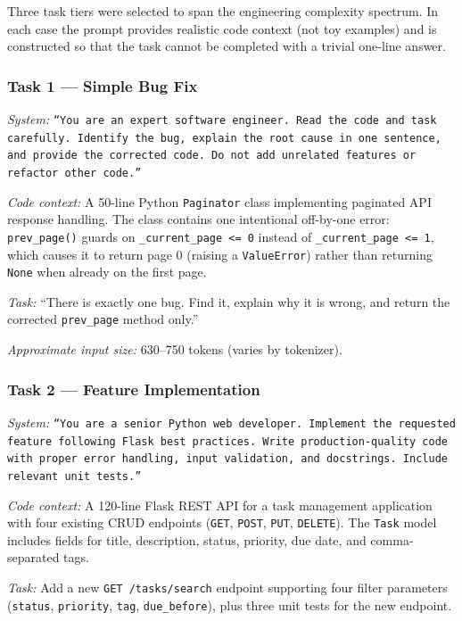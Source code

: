 \documentclass{article}
\begin{document}
Three task tiers were selected to span the engineering complexity spectrum.
In each case the prompt provides realistic code context (not toy examples) and
is constructed so that the task cannot be completed with a trivial one-line answer.

\subsubsection*{Task 1 --- Simple Bug Fix}

\textit{System:} \texttt{``You are an expert software engineer. Read the code and task
carefully. Identify the bug, explain the root cause in one sentence, and provide the
corrected code. Do not add unrelated features or refactor other code.''}

\textit{Code context:} A 50-line Python \texttt{Paginator} class implementing paginated
API response handling. The class contains one intentional off-by-one error:
\texttt{prev\_page()} guards on \texttt{\_current\_page <= 0} instead of
\texttt{\_current\_page <= 1}, which causes it to return page 0 (raising a
\texttt{ValueError}) rather than returning \texttt{None} when already on the first page.

\textit{Task:} ``There is exactly one bug. Find it, explain why it is wrong, and return
the corrected \texttt{prev\_page} method only.''

\textit{Approximate input size:} 630--750 tokens (varies by tokenizer).

\subsubsection*{Task 2 --- Feature Implementation}

\textit{System:} \texttt{``You are a senior Python web developer. Implement the requested
feature following Flask best practices. Write production-quality code with proper error
handling, input validation, and docstrings. Include relevant unit tests.''}

\textit{Code context:} A 120-line Flask REST API for a task management application with
four existing CRUD endpoints (\texttt{GET}, \texttt{POST}, \texttt{PUT}, \texttt{DELETE}).
The \texttt{Task} model includes fields for title, description, status, priority, due date,
and comma-separated tags.

\textit{Task:} Add a new \texttt{GET /tasks/search} endpoint supporting four filter
parameters (\texttt{status}, \texttt{priority}, \texttt{tag}, \texttt{due\_before}),
plus three unit tests for the new endpoint.
\end{document}
